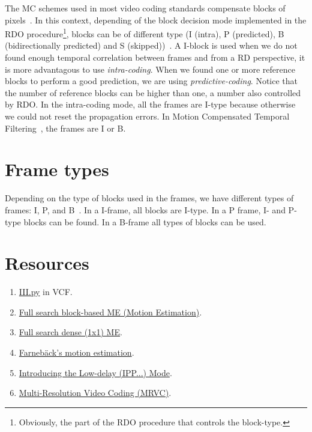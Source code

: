 The MC schemes used in most video coding standards compensate blocks
of pixels~\cite{vruiz__ME}. In this context, depending of the block
decision mode implemented in the RDO procedure\footnote{Obviously, the
  part of the RDO procedure that controls the block-type.}, blocks can
be of different type (I (intra), P (predicted), B (bidirectionally
predicted) and S (skipped))~\cite{vruiz__MC}. A I-block is used when
we do not found enough temporal correlation between frames and from a
RD perspective, it is more advantagous to use
\emph{intra-coding}. When we found one or more reference blocks to
perform a good prediction, we are using
\emph{predictive-coding}. Notice that the number of reference blocks
can be higher than one, a number also controlled by RDO. In the
intra-coding mode, all the frames are I-type because otherwise we
could not reset the propagation errors. In Motion Compensated Temporal
Filtering~\cite{vruiz__MCTF}, the frames are I or B.

\section{Frame types}

Depending on the type of blocks used in the frames, we have different
types of frames: I, P, and B~\cite{vruiz__MC}. In a I-frame, all
blocks are I-type. In a P frame, I- and P-type blocks can be found. In
a B-frame all types of blocks can be used.

\section{Resources}
\begin{enumerate}
\item \href{https://github.com/Sistemas-Multimedia/VCF/blob/main/notebooks/III.ipynb}{III.py} in VCF.
\item \href{https://github.com/vicente-gonzalez-ruiz/motion_estimation/blob/main/src/motion_estimation/full_search_block_ME.ipynb}{Full search block-based ME (Motion Estimation)}.
\item \href{https://github.com/vicente-gonzalez-ruiz/motion_estimation/blob/main/src/motion_estimation/full_search_dense_ME.ipynb}{Full search dense (1x1) ME}.
\item \href{https://github.com/vicente-gonzalez-ruiz/motion_estimation/blob/main/src/motion_estimation/farneback_ME.ipynb}{Farnebäck's motion estimation}.
\item \href{https://github.com/vicente-gonzalez-ruiz/motion_compensation/blob/master/introducing_IPPP.ipynb}{Introducing the Low-delay (IPP...) Mode}.
\item \href{https://github.com/Sistemas-Multimedia/MRVC}{Multi-Resolution Video Coding (MRVC)}.
\end{enumerate}

